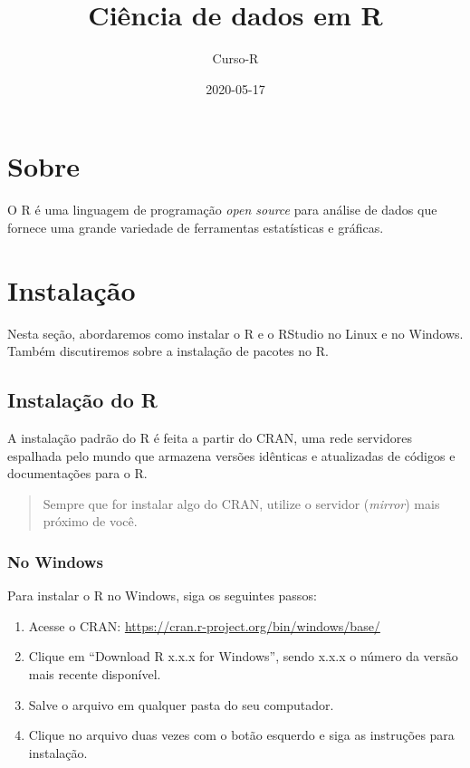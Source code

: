 \documentclass[]{book}
\title{Ciência de dados em R}
\author{Curso-R}
\date{2020-05-17}
\begin{document}
\maketitle

{
\setcounter{tocdepth}{1}
\tableofcontents
}
\hypertarget{sobre}{%
\chapter*{Sobre}\label{sobre}}

O R é uma linguagem de programação \emph{open source} para análise de dados que fornece uma grande variedade de ferramentas estatísticas e gráficas.

\hypertarget{instalauxe7uxe3o}{%
\chapter{Instalação}\label{instalauxe7uxe3o}}

Nesta seção, abordaremos como instalar o R e o RStudio no Linux e no Windows. Também discutiremos sobre a instalação de pacotes no R.

\hypertarget{instalauxe7uxe3o-do-r}{%
\section{Instalação do R}\label{instalauxe7uxe3o-do-r}}

A instalação padrão do R é feita a partir do CRAN, uma rede servidores espalhada pelo mundo que armazena versões idênticas e atualizadas de códigos e documentações para o R.

\begin{quote}
Sempre que for instalar algo do CRAN, utilize o servidor (\emph{mirror}) mais próximo de você.
\end{quote}

\hypertarget{no-windows}{%
\subsection{No Windows}\label{no-windows}}

Para instalar o R no Windows, siga os seguintes passos:

\begin{enumerate}
\def\labelenumi{\arabic{enumi}.}
\item
  Acesse o CRAN: \url{https://cran.r-project.org/bin/windows/base/}
\item
  Clique em ``Download R x.x.x for Windows'', sendo x.x.x o número da versão mais recente disponível.
\item
  Salve o arquivo em qualquer pasta do seu computador.
\item
  Clique no arquivo duas vezes com o botão esquerdo e siga as instruções para instalação.
\end{enumerate}
\end{document}
